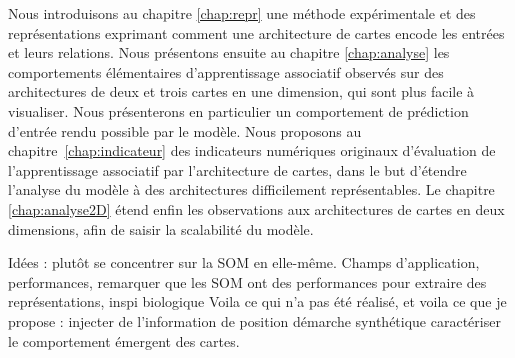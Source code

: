 Nous introduisons au chapitre \ref{chap:repr} une méthode expérimentale et des représentations exprimant comment une architecture de cartes encode les entrées et leurs relations.
Nous présentons ensuite au chapitre \ref{chap:analyse} les comportements élémentaires d'apprentissage associatif observés sur des architectures de deux et trois cartes en une dimension, qui sont plus facile à visualiser. 
Nous présenterons en particulier un comportement de prédiction d'entrée rendu possible par le modèle.
Nous proposons au chapitre~\ref{chap:indicateur} des indicateurs numériques originaux d'évaluation de l'apprentissage associatif par l'architecture de cartes, dans le but d'étendre l'analyse du modèle à des architectures difficilement représentables.
Le chapitre \ref{chap:analyse2D} étend enfin les observations aux architectures de cartes en deux dimensions, afin de saisir la scalabilité du modèle.




Idées : plutôt se concentrer sur la SOM en elle-même. Champs d'application, performances, remarquer que les SOM ont des performances pour extraire des représentations, inspi biologique
Voila ce qui n'a pas été réalisé, et voila ce que je propose : injecter de l'information de position 
démarche synthétique
caractériser le comportement émergent des cartes.